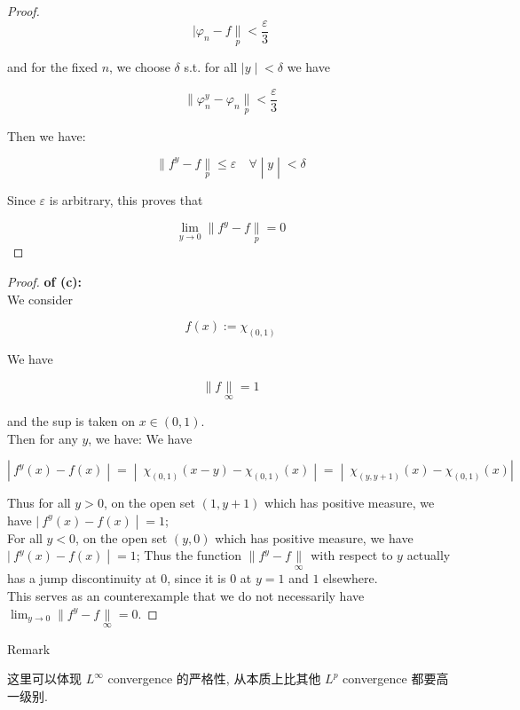 \begin{proof}
\[|\varphi_{n} - f\underset{p}{\parallel} < \frac{\varepsilon}{3}\]

and for the fixed \(n\), we choose \(\delta\) s.t. for all \(\left. |y \middle| < \delta \right.\) we have

\[\parallel \varphi_{n}^{y} - \varphi_{n}\underset{p}{\parallel} < \frac{\varepsilon}{3}\]

Then we have:

\[\left. \parallel f^{y} - f\underset{p}{\parallel} \leq \varepsilon\quad\forall \middle| y \middle| < \delta \right.\]

Since \(\varepsilon\) is arbitrary, this proves that

\[\lim\limits_{y\rightarrow 0} \parallel f^{y} - f\underset{p}{\parallel} = 0\]

\end{proof}

\begin{proof}

\textbf{of (c):}\\

We consider

\[f(x) := \chi_{(0,1)}\]

We have

\[\parallel f\underset{\infty}{\parallel} = 1\]

and the sup is taken on \(x \in (0,1)\).\\
Then for any \(y\), we have: We have

\[\left. |\ f^{y}(x) - f(x) \middle| = \middle| \ \chi_{(0,1)}(x - y) - \chi_{(0,1)}(x) \middle| = \middle| \ \chi_{(y,y + 1)}(x) - \chi_{(0,1)}(x)| \right.\]

Thus for all \(y > 0\), on the open set \((1,y + 1)\) which has positive measure, we have \(\left. |\ f^{y}(x) - f(x) \middle| = 1 \right.\);\\
For all \(y < 0\), on the open set \((y,0)\) which has positive measure, we have \(\left. |\ f^{y}(x) - f(x) \middle| = 1 \right.\); Thus the function \(\parallel f^{y} - f\underset{\infty}{\parallel}\) with respect to \(y\) actually has a jump discontinuity at \(0\), since it is \(0\) at \(y = 1\) and \(1\) elsewhere.\\
This serves as an counterexample that we do not necessarily have \(\lim_{y\rightarrow 0} \parallel f^{y} - f\underset{\infty}{\parallel} = 0\).

\end{proof}

\begin{qlremark}{Remark}

这里可以体现 \(L^{\infty}\) convergence 的严格性, 从本质上比其他 \(L^{p}\) convergence 都要高一级别.

\end{qlremark}

